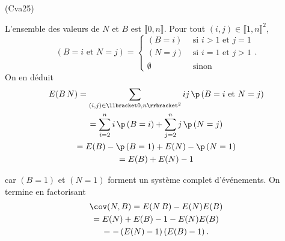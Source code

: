 \begin{tiny}(Cva25)\end{tiny} L'ensemble des valeurs de $N$ et $B$ est $\llbracket 0,n \rrbracket$. Pour tout $(i,j) \in \llbracket 1,n \rrbracket^2$,
\[
 \left( B = i \text{ et } N = j\right) =
\left\lbrace 
\begin{aligned}
 \left( B = i\right) &\text{ si } i>1 \text{ et } j = 1\\
 \left( N = j\right) &\text{ si } i=1 \text{ et } j > 1\\
 \emptyset &\text{ sinon}
\end{aligned}
\right. .
\]
On en déduit
\begin{multline*}
 E(B\,N)
 = \sum_{(i,j)\in \llbracket 0,n \rrbracket^2}ij\,\p\left( B = i \text{ et } N = j\right)\\
 = \sum_{i=2}^{n}i\,\p\left( B = i\right) + \sum_{j=2}^{n}j\,\p\left( N = j\right) \\
 = E(B) - \p\left( B = 1\right) + E(N) - \p\left( N = 1\right) \\
 = E(B) + E(N) - 1
\end{multline*}

car $\left( B = 1\right)$ et $\left( N = 1\right)$ forment un système complet d'événements.
On termine en factorisant
\begin{multline*}
 \cov(N,B) = E(N\,B) - E(N)E(B)\\
 = E(N) + E(B) -1 - E(N)E(B)\\
 = -\left( E(N) - 1\right)\left( E(B) - 1\right). 
\end{multline*}
